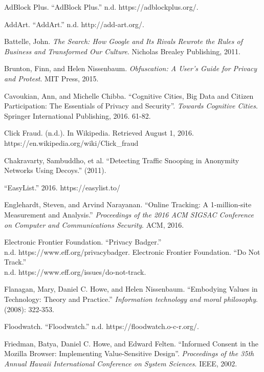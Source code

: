 \documentclass[conference]{IEEEtran}
\begin{document}
\begin{thebibliography}{99}

 AdBlock Plus. “AdBlock Plus.” n.d. https://adblockplus.org/.

 AddArt. “AddArt.” n.d. http://add-art.org/.

 Battelle, John. \textit{ The Search: How Google and Its Rivals Rewrote the Rules of Business and Transformed Our Culture}. Nicholas Brealey Publishing, 2011.

 Brunton, Finn, and Helen Nissenbaum. \textit{Obfuscation: A User's Guide for Privacy and Protest}. MIT Press, 2015.

 Cavoukian, Ann, and Michelle Chibba. “Cognitive Cities, Big Data and Citizen Participation: The Essentials of Privacy and Security”. \textit{Towards Cognitive Cities}. Springer International Publishing, 2016. 61-82.

 Click Fraud. (n.d.). In Wikipedia. Retrieved August 1, 2016. https://en.wikipedia.org/wiki/Click\_fraud

 Chakravarty, Sambuddho, et al. “Detecting Traffic Snooping in Anonymity Networks Using Decoys.” (2011).

 “EasyList.” 2016. https://easylist.to/

 Englehardt, Steven, and Arvind Narayanan. “Online Tracking: A 1-million-site Measurement and Analysis.” \textit{Proceedings of the 2016 ACM SIGSAC Conference on Computer and Communications Security}. ACM, 2016.

 Electronic Frontier Foundation. “Privacy Badger.”\\n.d. https://www.eff.org/privacybadger.
 Electronic Frontier Foundation. “Do Not Track.”\\n.d. https://www.eff.org/issues/do-not-track.

 Flanagan, Mary, Daniel C. Howe, and Helen Nissenbaum. “Embodying Values in Technology: Theory and Practice.” \textit{Information technology and moral philosophy}. (2008): 322-353.

 Floodwatch. “Floodwatch.” n.d. https://floodwatch.o-c-r.org/.

 Friedman, Batya, Daniel C. Howe, and Edward Felten. “Informed Consent in the Mozilla Browser: Implementing Value-Sensitive Design”. \textit{Proceedings of the 35th Annual Hawaii International Conference on System Sciences}. IEEE, 2002.


\end{thebibliography}
\end{document}
